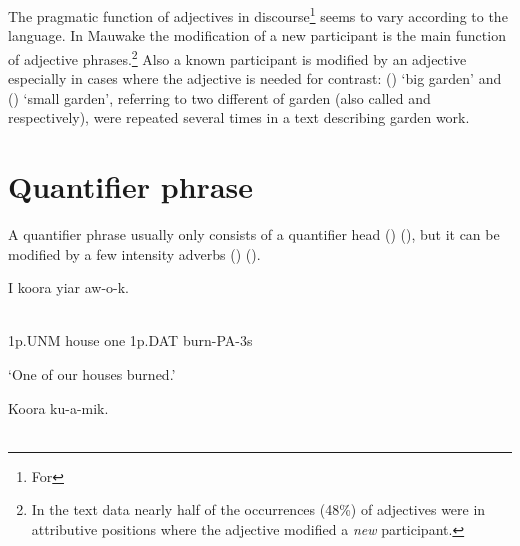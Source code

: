 The pragmatic function of adjectives in discourse\footnote{For } seems to vary according to the language. In Mauwake the modification of a new participant is the main function of adjective phrases.\footnote{In the text data nearly half of the occurrences (48\%) of adjectives were in attributive positions where the adjective modified a \textit{new} participant.} Also a known participant is modified by an adjective especially in cases where the adjective is needed for contrast: ()  `big garden' and () \textstyleEmphasizedWords{} `small garden', referring to two different  of garden (also called  and  respectively), were repeated several times in a text describing garden work. 

\section{Quantifier phrase}
\hypertarget{RefHeading21761935131865}{}
A quantifier phrase usually only consists of a quantifier head () (), but it can be modified by a few intensity adverbs () (). 

\ea%
\label{ex:x845}
\gll I  koora    yiar  aw-o-k. \\
      \\
\glt
\z

1p.UNM  house  one  1p.DAT  burn-PA-3s

`One of our houses burned.'

\ea%
\label{ex:x844}
\gll Koora    ku-a-mik. \\
      \\
\glt
\z

